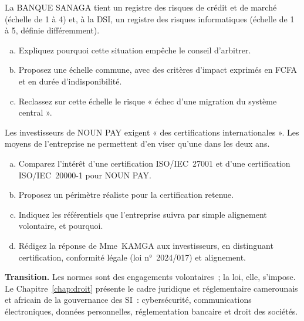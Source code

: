 \begin{boxexo}[title={\ding{45}\quad Exercice~9.2. Deux registres, une échelle \niveaumoyen}]
La BANQUE SANAGA tient un registre des risques de crédit et de marché
(échelle de 1 à 4) et, à la DSI, un registre des risques informatiques
(échelle de 1 à 5, définie différemment).
\begin{enumerate}[(a)]
    \item Expliquez pourquoi cette situation empêche le conseil
          d'arbitrer.
    \item Proposez une échelle commune, avec des critères d'impact
          exprimés en FCFA et en durée d'indisponibilité.
    \item Reclassez sur cette échelle le risque « échec d'une migration du
          système central ».
\end{enumerate}
\end{boxexo}

\begin{boxexo}[title={\ding{45}\quad Exercice~9.3. Une stratégie normative pour NOUN PAY \niveauexpert}]
Les investisseurs de NOUN PAY exigent « des certifications
internationales ». Les moyens de l'entreprise ne permettent d'en viser
qu'une dans les deux ans.
\begin{enumerate}[(a)]
    \item Comparez l'intérêt d'une certification ISO/IEC~27001 et d'une
          certification ISO/IEC~20000-1 pour NOUN PAY.
    \item Proposez un périmètre réaliste pour la certification retenue.
    \item Indiquez les référentiels que l'entreprise suivra par simple
          alignement volontaire, et pourquoi.
    \item Rédigez la réponse de Mme~KAMGA aux investisseurs, en distinguant
          certification, conformité légale (loi n°~2024/017) et
          alignement.
\end{enumerate}
\end{boxexo}

\bigskip

\begin{boxinfo}
\textbf{Transition.} Les normes sont des engagements volontaires~; la loi,
elle, s'impose. Le Chapitre~\ref{chap:droit} présente le cadre juridique
et réglementaire camerounais et africain de la gouvernance des SI~:
cybersécurité, communications électroniques, données personnelles,
réglementation bancaire et droit des sociétés.
\end{boxinfo}
